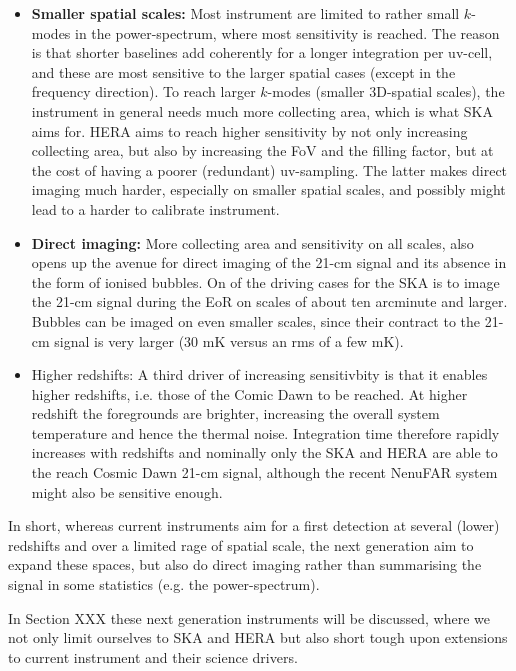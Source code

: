 \begin{itemize}
    \item {\bf Smaller spatial scales:} Most instrument are limited to rather small $k$-modes in the power-spectrum, where most sensitivity is reached. The reason is that shorter baselines add coherently for a longer integration per uv-cell, and these are most sensitive to the larger spatial cases (except in the frequency direction). To reach larger $k$-modes (smaller 3D-spatial scales), the instrument in general needs much more collecting area, which is what SKA aims for. HERA aims to reach higher sensitivity by not only increasing collecting area, but also by increasing the FoV and the filling factor, but at the cost of having a poorer (redundant) uv-sampling. The latter makes direct imaging much harder, especially on smaller spatial scales, and possibly might lead to a harder to calibrate instrument.
    \item {\bf Direct imaging:} More collecting area and sensitivity on all scales, also opens up the avenue for direct imaging of the 21-cm signal and its absence in the form of ionised bubbles. On of the driving cases for the SKA is to image the 21-cm signal during the EoR on scales of about ten arcminute and larger. Bubbles can be imaged on even smaller scales, since their contract to the 21-cm signal is very larger (30 mK versus an rms of a few mK). 
    \item {Higher redshifts:} A third driver of increasing sensitivbity is that it enables higher redshifts, i.e. those of the Comic Dawn to be reached. At higher redshift the foregrounds are brighter, increasing the overall system temperature and hence the thermal noise. Integration time therefore rapidly increases with redshifts and nominally only the SKA and HERA are able to the reach Cosmic Dawn 21-cm signal, although the recent NenuFAR system might also be sensitive enough. 
\end{itemize}

In short, whereas current instruments aim for a first detection at several (lower) redshifts and over a limited 
rage of spatial scale, the next generation aim to expand these spaces, but also do direct imaging rather than summarising the signal in some statistics (e.g. the power-spectrum). 

In Section XXX these next generation instruments will be discussed, where we not only limit ourselves to SKA and HERA but also short tough upon extensions to current instrument and their science drivers. 

